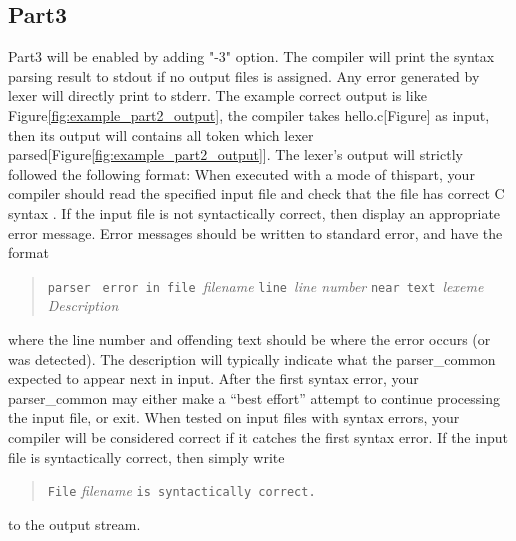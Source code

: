 \documentclass{report}
\newcommand{\+}{}
\begin{document}
    \subsection{Part3}\label{subsec:part3}
    Part3 will be enabled by adding "-3" option. The compiler will print the syntax parsing result to stdout if no output
    files is assigned. Any error generated by lexer will directly print to stderr. The example correct output is like
    Figure\ref{fig:example_part2_output}, the compiler takes hello.c[Figure] as input, then its output will contains all
    token which lexer parsed[Figure\ref{fig:example_part2_output}]. The lexer's output will strictly followed the
    following format:
    When executed with a mode of thispart, your compiler should read the specified input file and check that the file has correct C syntax . If the input file is not syntactically correct, then display an appropriate error message. Error messages should be written to standard error, and have the format
    \begin{quote}
        \begin{tabbing}
        {\tt parser }
            \={\tt error in file }\emph{filename}
            {\tt line }\emph{line number}
            {\tt near text }\emph{lexeme}
            \\
            \> \emph{Description}
        \end{tabbing}
    \end{quote}
    where the line number and offending text should be where the error occurs (or was detected). The description will typically indicate what the parser_common expected to appear next in input. After the first syntax error, your parser_common may either make a ``best effort'' attempt to continue processing the input file, or exit. When tested on input files with syntax errors, your compiler will be considered correct if it catches the first syntax error. If the input file is syntactically correct, then simply write
    \begin{quote}
        \verb|File| \emph{filename} \verb|is syntactically correct.|
    \end{quote}
    to the output stream.
\end{document}
